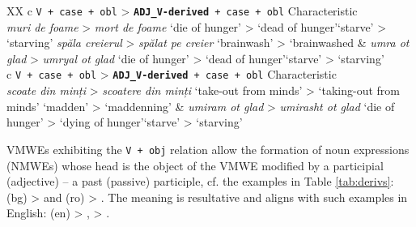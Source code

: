 \documentclass[output=paper,colorlinks,citecolor=brown]{langscibook}
\begin{document}
\begin{table}
\begin{tabularx}{\textwidth}{XX}
 {c} {\texttt{V + case + obl} > \texttt{\textbf{ADJ\_V-derived} + case + obl}} {Characteristic}%
\\\midrule
\textit{muri de foame} > \textit{mort de foame} \newline `die of hunger' > `dead of hunger'\newline `starve' > `starving' \newline \textit{spăla creierul} > \textit{spălat pe creier} \newline `brainwash' > `brainwashed & \textit{umra ot glad} > \textit{umryal ot glad}  \newline `die of hunger' > `dead of hunger'\newline `starve' > `starving'  \\\midrule
{} {c} {\texttt{V + case + obl} > \texttt{\textbf{ADJ\_V-derived} + case + obl}} {Characteristic}%
\\\midrule
\textit{scoate din minți} > \textit{scoatere din minți} \newline `take-out from minds' > `taking-out from minds' \newline `madden' > `maddenning'
& \textit{umiram ot glad} > \textit{umirasht ot glad}  \newline `die of hunger' > `dying of hunger'\newline `starve' > `starving'  \\ 
\lspbottomrule
\end{tabularx}
\caption{The most frequent syntactic patterns involved in the VMWE-to-OtherPOS-MWE derivation.} \label{tab:derivs}
\end{table}

VMWEs exhibiting the \texttt{V + obj} relation allow the formation of noun expressions (NMWEs) whose head is the object of the VMWE modified by a participial (adjective) -- a past (passive) participle, cf. the examples in Table \ref{tab:derivs}: (bg)  >  and (ro)  > . The meaning is resultative and aligns with such examples in English:  (en)  > ,  > . 
\end{document}
